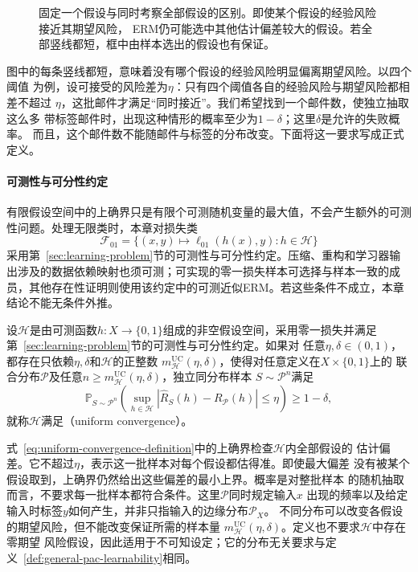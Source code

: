 \begin{figure}[htbp]
  \centering
  
  \caption{固定一个假设与同时考察全部假设的区别。即使某个假设的经验风险接近其期望风险，
  ERM仍可能选中其他估计偏差较大的假设。若全部竖线都短，框中由样本选出的假设也有保证。}
  \label{fig:learning-uniform-convergence}
\end{figure}

图中的每条竖线都短，意味着没有哪个假设的经验风险明显偏离期望风险。以四个阈值
为例，设可接受的风险差为$\eta$：只有四个阈值各自的经验风险与期望风险都相差不超过
$\eta$，这批邮件才满足“同时接近”。我们希望找到一个邮件数，使独立抽取这么多
带标签邮件时，出现这种情形的概率至少为$1-\delta$；这里$\delta$是允许的失败概率。
而且，这个邮件数不能随邮件与标签的分布改变。下面将这一要求写成正式定义。

\paragraph{可测性与可分性约定}

有限假设空间中的上确界只是有限个可测随机变量的最大值，不会产生额外的可测性问题。处理无限类时，本章对损失类
\[
 \mathcal F_{01}=\{(x,y)\mapsto\ell_{01}(h(x),y):h\in\mathcal H\}
\]
采用第~\ref{sec:learning-problem}节的可测性与可分性约定。压缩、重构和学习器输出涉及的数据依赖映射也须可测；可实现的零一损失样本可选择与样本一致的成员，其他存在性证明则使用该约定中的可测近似ERM。若这些条件不成立，本章结论不能无条件外推。

\begin{definition}[一致收敛]
\label{def:uniform-convergence}
设$\mathcal H$是由可测函数$h:X\to\{0,1\}$组成的非空假设空间，采用零一损失并满足
第~\ref{sec:learning-problem}节的可测性与可分性约定。如果对
任意$\eta,\delta\in(0,1)$，都存在只依赖$\eta,\delta$和$\mathcal H$的正整数
$m_{\mathcal H}^{\mathrm{UC}}(\eta,\delta)$，使得对任意定义在$X\times\{0,1\}$上的
联合分布$\mathcal P$及任意$n\geq m_{\mathcal H}^{\mathrm{UC}}(\eta,\delta)$，独立同分布样本
$S\sim\mathcal P^n$满足
\begin{equation}
 \mathbb P_{S\sim\mathcal P^n}\left(
   \sup_{h\in\mathcal H}|\hat R_S(h)-R_{\mathcal P}(h)|\leq\eta
 \right)\geq1-\delta,
 \label{eq:uniform-convergence-definition}
\end{equation}
就称$\mathcal H$满足（uniform convergence）。
\end{definition}

式~\eqref{eq:uniform-convergence-definition}中的上确界检查$\mathcal H$内全部假设的
估计偏差。它不超过$\eta$，表示这一批样本对每个假设都估得准。即使最大偏差
没有被某个假设取到，上确界仍然给出这些偏差的最小上界。概率是对整批样本
的随机抽取而言，不要求每一批样本都符合条件。这里$\mathcal P$同时规定输入$x$
出现的频率以及给定输入时标签$y$如何产生，并非只指输入的边缘分布$\mathcal P_X$。
不同分布可以改变各假设的期望风险，但不能改变保证所需的样本量
$m_{\mathcal H}^{\mathrm{UC}}(\eta,\delta)$。定义也不要求$\mathcal H$中存在零期望
风险假设，因此适用于不可知设定；它的分布无关要求与定义~\ref{def:general-pac-learnability}相同。

